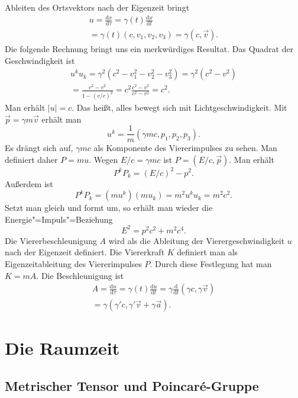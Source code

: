 \documentclass[a4paper,11pt,fleqn,twocolumn,twoside,dvipdfmx]{scrartcl}
\begin{document}
Ableiten des Ortsvektors nach der Eigenzeit bringt%
\begin{gather*}
u = \frac{\mathrm dx}{\mathrm d\tau}
= \gamma(t)\frac{\mathrm dx}{\mathrm dt}\\
= \gamma(t)(c,v_1,v_2,v_3) = \gamma(c,\vec v).
\end{gather*}
Die folgende Rechnung bringt uns ein merkwürdiges Resultat.
Das Quadrat der Geschwindigkeit ist%
\begin{gather*}
u^k u_k = \gamma^2 (c^2-v_1^2-v_2^2-v_3^2)
= \gamma^2 (c^2-v^2)\\
= \frac{c^2-v^2}{1-(v/c)^2}
= c^2 \frac{c^2-v^2}{c^2-v^2}
= c^2.
\end{gather*}
Man erhält $|u|=c$. Das heißt, alles bewegt sich mit
Lichtgeschwindigkeit. Mit $\vec p=\gamma m\vec v$
erhält man%
\[u^k = \frac{1}{m} (\gamma mc,p_1,p_2,p_3).\]
Es drängt sich auf, $\gamma mc$ als Komponente des Viererimpulses
zu sehen. Man definiert daher $P = mu.$
Wegen $E/c=\gamma mc$ ist $P=(E/c,\vec p)$. Man erhält%
\[P^k P_k = (E/c)^2-p^2.\]
Außerdem ist
\[P^k P_k = (mu^k)(mu_k) = m^2 u^k u_k = m^2 c^2.\]
Setzt man gleich und formt um, so erhält man wieder die
Energie"=Impuls"=Beziehung%
\[E^2 = p^2c^2 + m^2c^4.\]
Die Viererbeschleunigung $A$ wird als die Ableitung der
Vierergeschwindigkeit $u$ nach der Eigenzeit definiert.
Die Viererkraft $K$ definiert man als Eigenzeitableitung des
Viererimpulses $P$. Durch diese Festlegung hat man $K=mA$.
Die Beschleunigung ist%
\begin{gather*}
A = \frac{\mathrm du}{\mathrm d\tau}
= \gamma(t)\frac{\mathrm du}{\mathrm dt}
= \gamma\frac{\mathrm d}{\mathrm dt}(\gamma c,\gamma\vec v)\\
= \gamma (\gamma' c,\gamma'\vec v+\gamma\vec a).
\end{gather*}

\section{Die Raumzeit}
\subsection{\texorpdfstring{Metrischer Tensor und\newline
Poincaré-Gruppe}{Metrischer Tensor und Poincare-Gruppe}}
\end{document}
